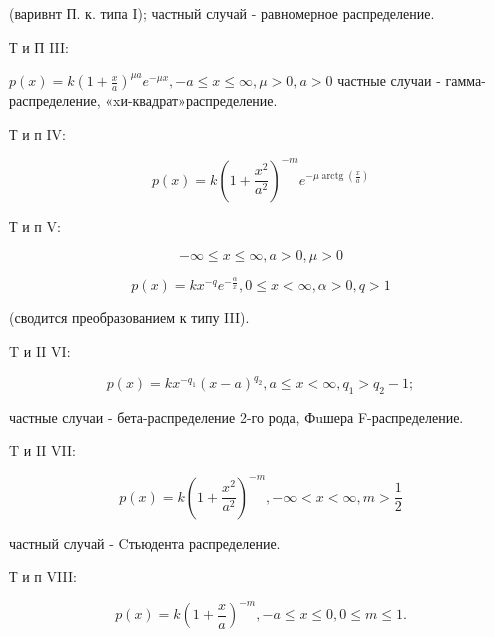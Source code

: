\documentclass[10pt]{article}
\begin{document}
(варивнт П. к. типа I); частный случай - равномерное распределение.



Т и П III:



$p(x)=k\left(1+\frac{x}{a}\right)^{\mu a} e^{-\mu x},-a \leqslant x \leqslant \infty, \mu>0, a>0$ частные случаи - гамма-распределение, «xи-квадрат»распределение.



Т и п IV:



\[

p(x)=k\left(1+\frac{x^{2}}{a^{2}}\right)^{-m} e^{-\mu \operatorname{arctg}\left(\frac{x}{a}\right)}

\]



Т и п V:



\[

-\infty \leqslant x \leqslant \infty, a>0, \mu>0

\]



\[

p(x)=k x^{-q} e^{-\frac{\alpha}{x}}, 0 \leqslant x<\infty, \alpha>0, q>1

\]



(сводится преобразованием к типу III).



T и II VI:



\[

p(x)=k x^{-q_{1}}(x-a)^{q_{2}}, a \leqslant x<\infty, q_{1}>q_{2}-1 ;

\]



частные случаи - бета-распределение 2-го рода, Фuшера F-распределение.



T и II VII:



\[

p(x)=k\left(1+\frac{x^{2}}{a^{2}}\right)^{-m},-\infty<x<\infty, m>\frac{1}{2}

\]



частный случай - Cтьюдента распределение.



Т и п VIII:



\[

p(x)=k\left(1+\frac{x}{a}\right)^{-m},-a \leqslant x \leqslant 0,0 \leqslant m \leqslant 1 .

\]
\end{document}
